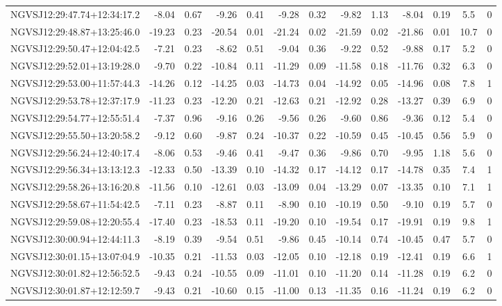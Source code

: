 \begin{tabular}{lrrrrrrrrrrcc}
NGVSJ12:29:47.74+12:34:17.2 & -8.04 & 0.67 & -9.26 & 0.41 & -9.28 & 0.32 & -9.82 & 1.13 & -8.04 & 0.19 & 5.5 & 0 \\
NGVSJ12:29:48.87+13:25:46.0 & -19.23 & 0.23 & -20.54 & 0.01 & -21.24 & 0.02 & -21.59 & 0.02 & -21.86 & 0.01 & 10.7 & 0 \\
NGVSJ12:29:50.47+12:04:42.5 & -7.21 & 0.23 & -8.62 & 0.51 & -9.04 & 0.36 & -9.22 & 0.52 & -9.88 & 0.17 & 5.2 & 0 \\
NGVSJ12:29:52.01+13:19:28.0 & -9.70 & 0.22 & -10.84 & 0.11 & -11.29 & 0.09 & -11.58 & 0.18 & -11.76 & 0.32 & 6.3 & 0 \\
NGVSJ12:29:53.00+11:57:44.3 & -14.26 & 0.12 & -14.25 & 0.03 & -14.73 & 0.04 & -14.92 & 0.05 & -14.96 & 0.08 & 7.8 & 1 \\
NGVSJ12:29:53.78+12:37:17.9 & -11.23 & 0.23 & -12.20 & 0.21 & -12.63 & 0.21 & -12.92 & 0.28 & -13.27 & 0.39 & 6.9 & 0 \\
NGVSJ12:29:54.77+12:55:51.4 & -7.37 & 0.96 & -9.16 & 0.26 & -9.56 & 0.26 & -9.60 & 0.86 & -9.36 & 0.12 & 5.4 & 0 \\
NGVSJ12:29:55.50+13:20:58.2 & -9.12 & 0.60 & -9.87 & 0.24 & -10.37 & 0.22 & -10.59 & 0.45 & -10.45 & 0.56 & 5.9 & 0 \\
NGVSJ12:29:56.24+12:40:17.4 & -8.06 & 0.53 & -9.46 & 0.41 & -9.47 & 0.36 & -9.86 & 0.70 & -9.95 & 1.18 & 5.6 & 0 \\
NGVSJ12:29:56.34+13:13:12.3 & -12.33 & 0.50 & -13.39 & 0.10 & -14.32 & 0.17 & -14.12 & 0.17 & -14.78 & 0.35 & 7.4 & 1 \\
NGVSJ12:29:58.26+13:16:20.8 & -11.56 & 0.10 & -12.61 & 0.03 & -13.09 & 0.04 & -13.29 & 0.07 & -13.35 & 0.10 & 7.1 & 1 \\
NGVSJ12:29:58.67+11:54:42.5 & -7.11 & 0.23 & -8.87 & 0.11 & -8.90 & 0.10 & -10.19 & 0.50 & -9.10 & 0.19 & 5.7 & 0 \\
NGVSJ12:29:59.08+12:20:55.4 & -17.40 & 0.23 & -18.53 & 0.11 & -19.20 & 0.10 & -19.54 & 0.17 & -19.91 & 0.19 & 9.8 & 1 \\
NGVSJ12:30:00.94+12:44:11.3 & -8.19 & 0.39 & -9.54 & 0.51 & -9.86 & 0.45 & -10.14 & 0.74 & -10.45 & 0.47 & 5.7 & 0 \\
NGVSJ12:30:01.15+13:07:04.9 & -10.35 & 0.21 & -11.53 & 0.03 & -12.05 & 0.10 & -12.18 & 0.19 & -12.41 & 0.19 & 6.6 & 1 \\
NGVSJ12:30:01.82+12:56:52.5 & -9.43 & 0.24 & -10.55 & 0.09 & -11.01 & 0.10 & -11.20 & 0.14 & -11.28 & 0.19 & 6.2 & 0 \\
NGVSJ12:30:01.87+12:12:59.7 & -9.43 & 0.21 & -10.60 & 0.15 & -11.00 & 0.13 & -11.35 & 0.16 & -11.24 & 0.19 & 6.2 & 0 \\

\end{tabular}
